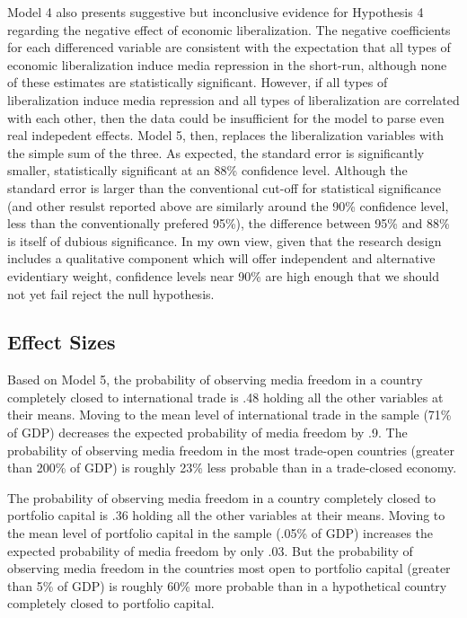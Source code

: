 \documentclass[12pt]{report}
\begin{document}
Model 4 also presents suggestive but inconclusive evidence for Hypothesis
4 regarding the negative effect of economic liberalization. The negative
coefficients for each differenced variable are consistent with the
expectation that all types of economic liberalization induce media
repression in the short-run, although none of these estimates are
statistically significant. However, if all types of liberalization
induce media repression and all types of liberalization are correlated
with each other, then the data could be insufficient for the model
to parse even real indepedent effects. Model 5, then, replaces the
liberalization variables with the simple sum of the three. As expected,
the standard error is significantly smaller, statistically significant
at an 88\% confidence level. Although the standard error is larger
than the conventional cut-off for statistical significance (and other
resulst reported above are similarly around the 90\% confidence level,
less than the conventionally prefered 95\%), the difference between
95\% and 88\% is itself of dubious significance. In my own view, given
that the research design includes a qualitative component which will
offer independent and alternative evidentiary weight, confidence levels
near 90\% are high enough that we should not yet fail reject the null
hypothesis.

\subsection{Effect Sizes}

Based on Model 5, the probability of observing media freedom in a
country completely closed to international trade is .48 holding all
the other variables at their means. Moving to the mean level of international
trade in the sample (71\% of GDP) decreases the expected probability
of media freedom by .9. The probability of observing media freedom
in the most trade-open countries (greater than 200\% of GDP) is roughly
23\% less probable than in a trade-closed economy.

The probability of observing media freedom in a country completely
closed to portfolio capital is .36 holding all the other variables
at their means. Moving to the mean level of portfolio capital in the
sample (.05\% of GDP) increases the expected probability of media
freedom by only .03. But the probability of observing media freedom
in the countries most open to portfolio capital (greater than 5\%
of GDP) is roughly 60\% more probable than in a hypothetical country
completely closed to portfolio capital.
\end{document}
